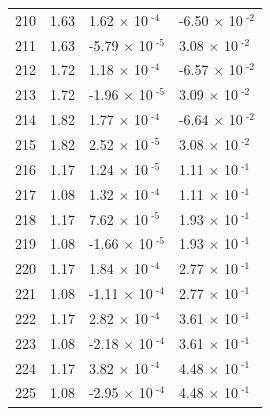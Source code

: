 \documentclass[a4paper,11pt]{article}
\begin{document}
\begin{center}
\begin{longtable}{|R{1.5cm}|R{2.5cm}|R{2.5cm}|R{2.5cm}|}
  210 &   1.63  &         1.62 $\times$ 10$^{\text{          -4}}$  &        -6.50 $\times$ 10$^{\text{          -2}}$ \\ 
  211 &   1.63  &        -5.79 $\times$ 10$^{\text{          -5}}$  &         3.08 $\times$ 10$^{\text{          -2}}$ \\ 
  212 &   1.72  &         1.18 $\times$ 10$^{\text{          -4}}$  &        -6.57 $\times$ 10$^{\text{          -2}}$ \\ 
  213 &   1.72  &        -1.96 $\times$ 10$^{\text{          -5}}$  &         3.09 $\times$ 10$^{\text{          -2}}$ \\ 
  214 &   1.82  &         1.77 $\times$ 10$^{\text{          -4}}$  &        -6.64 $\times$ 10$^{\text{          -2}}$ \\ 
  215 &   1.82  &         2.52 $\times$ 10$^{\text{          -5}}$  &         3.08 $\times$ 10$^{\text{          -2}}$ \\ 
  216 &   1.17  &         1.24 $\times$ 10$^{\text{          -5}}$  &         1.11 $\times$ 10$^{\text{          -1}}$ \\ 
  217 &   1.08  &         1.32 $\times$ 10$^{\text{          -4}}$  &         1.11 $\times$ 10$^{\text{          -1}}$ \\ 
  218 &   1.17  &         7.62 $\times$ 10$^{\text{          -5}}$  &         1.93 $\times$ 10$^{\text{          -1}}$ \\ 
  219 &   1.08  &        -1.66 $\times$ 10$^{\text{          -5}}$  &         1.93 $\times$ 10$^{\text{          -1}}$ \\ 
  220 &   1.17  &         1.84 $\times$ 10$^{\text{          -4}}$  &         2.77 $\times$ 10$^{\text{          -1}}$ \\ 
  221 &   1.08  &        -1.11 $\times$ 10$^{\text{          -4}}$  &         2.77 $\times$ 10$^{\text{          -1}}$ \\ 
  222 &   1.17  &         2.82 $\times$ 10$^{\text{          -4}}$  &         3.61 $\times$ 10$^{\text{          -1}}$ \\ 
  223 &   1.08  &        -2.18 $\times$ 10$^{\text{          -4}}$  &         3.61 $\times$ 10$^{\text{          -1}}$ \\ 
  224 &   1.17  &         3.82 $\times$ 10$^{\text{          -4}}$  &         4.48 $\times$ 10$^{\text{          -1}}$ \\ 
  225 &   1.08  &        -2.95 $\times$ 10$^{\text{          -4}}$  &         4.48 $\times$ 10$^{\text{          -1}}$ \\ 

\end{longtable}
\end{center}
\end{document}
